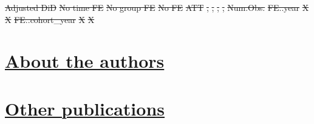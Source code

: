 \documentclass[
  letterpaper,
  DIV=11,
  numbers=noendperiod]{scrartcl}
\providecommand{\DIFadd}[1]{{\protect\color{blue}\underline{#1}}} %
\providecommand{\DIFdel}[1]{{\protect\color{red}\sout{#1}}}                      %
\providecommand{\DIFaddbegin}{} %
\providecommand{\DIFaddend}{} %
\providecommand{\DIFdelbegin}{} %
\providecommand{\DIFdelend}{} %
\providecommand{\DIFdelFL}[1]{\DIFdel{#1}} %
\newcommand{\DIFscaledelfig}{0.5}
\newlength{\DIFdelgraphicswidth} %
\newlength{\DIFdelgraphicsheight} %
\newcommand{\DIFaddincludegraphics}[2][]{{\color{blue}\fbox{\DIFOincludegraphics[#1]{#2}}}} %
\newcommand{\DIFdelincludegraphics}[2][]{%
\sbox{\DIFdelgraphicsbox}{\DIFOincludegraphics[#1]{#2}}%
\settoboxwidth{\DIFdelgraphicswidth}{\DIFdelgraphicsbox} %
\settoboxtotalheight{\DIFdelgraphicsheight}{\DIFdelgraphicsbox} %
\scalebox{\DIFscaledelfig}{%
\parbox[b]{\DIFdelgraphicswidth}{\usebox{\DIFdelgraphicsbox}\\[-\baselineskip] \rule{\DIFdelgraphicswidth}{0em}}\llap{\resizebox{\DIFdelgraphicswidth}{\DIFdelgraphicsheight}{%
\setlength{\unitlength}{\DIFdelgraphicswidth}%
\begin{picture}(1,1)%
\thicklines\linethickness{2pt} %
{\color[rgb]{1,0,0}\put(0,0){\framebox(1,1){}}}%
{\color[rgb]{1,0,0}\put(0,0){\line( 1,1){1}}}%
{\color[rgb]{1,0,0}\put(0,1){\line(1,-1){1}}}%
\end{picture}%
}\hspace*{3pt}}} %
} %
\DeclareRobustCommand{\DIFaddbegin}{\DIFOaddbegin \let\includegraphics\DIFaddincludegraphics} %
\DeclareRobustCommand{\DIFaddend}{\DIFOaddend \let\includegraphics\DIFOincludegraphics} %
\DeclareRobustCommand{\DIFdelbegin}{\DIFOdelbegin \let\includegraphics\DIFdelincludegraphics} %
\DeclareRobustCommand{\DIFdelend}{\DIFOaddend \let\includegraphics\DIFOincludegraphics} %
\begin{document}
\DIFdelFL{Adjusted DiD }%
\DIFdelFL{No time FE }%
\DIFdelFL{No group FE }%
\DIFdelFL{No FE}%
\DIFdelFL{ATT }%
\DIFdelFL{, }%
\DIFdelFL{, }%
\DIFdelFL{, }%
\DIFdelFL{, }%
\DIFdelFL{Num.Obs. }%
\DIFdelFL{FE..year }%
\DIFdelFL{X }%
\DIFdelFL{X }%
\DIFdelFL{FE..cohort\_year }%
\DIFdelFL{X }%
\DIFdelFL{X }%

\DIFdelend \newpage

\DIFdelbegin %
\DIFdelend \DIFaddbegin \section*{\DIFadd{About the authors}}\label{about-the-authors}
\DIFaddend {}

\DIFdelbegin %
\DIFdelend \DIFaddbegin \section*{\DIFadd{Other publications}}\label{other-publications}
\DIFaddend {}
\end{document}
